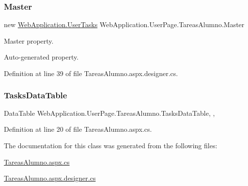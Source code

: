 \subsubsection{\texorpdfstring{Master}{Master}}
{\footnotesize\ttfamily new \mbox{\hyperlink{classWebApplication_1_1UserTasks}{Web\+Application.\+User\+Tasks}} Web\+Application.\+User\+Page.\+Tareas\+Alumno.\+Master\hspace{0.3cm}{\ttfamily [get]}}



Master property. 

Auto-\/generated property. 

Definition at line 39 of file Tareas\+Alumno.\+aspx.\+designer.\+cs.

\mbox{\label{classWebApplication_1_1UserPage_1_1TareasAlumno_a8821f4d83835e4451c0bcc48fea3001f}} 
\subsubsection{\texorpdfstring{TasksDataTable}{TasksDataTable}}
{\footnotesize\ttfamily Data\+Table Web\+Application.\+User\+Page.\+Tareas\+Alumno.\+Tasks\+Data\+Table\hspace{0.3cm}{\ttfamily [get]}, {\ttfamily [set]}, {\ttfamily [private]}}



Definition at line 20 of file Tareas\+Alumno.\+aspx.\+cs.



The documentation for this class was generated from the following files\+:\begin{DoxyCompactItemize}
\item 
\mbox{\hyperlink{TareasAlumno_8aspx_8cs}{Tareas\+Alumno.\+aspx.\+cs}}\item 
\mbox{\hyperlink{TareasAlumno_8aspx_8designer_8cs}{Tareas\+Alumno.\+aspx.\+designer.\+cs}}\end{DoxyCompactItemize}
